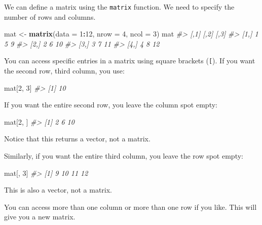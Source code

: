 \documentclass[
]{krantz}
\newenvironment{Shaded}{\begin{snugshade}}{\end{snugshade}}
\newcommand{\CommentTok}[1]{\textcolor[rgb]{0.37,0.37,0.37}{\textit{#1}}}
\newcommand{\DataTypeTok}[1]{\textcolor[rgb]{0.27,0.27,0.27}{#1}}
\newcommand{\DecValTok}[1]{\textcolor[rgb]{0.06,0.06,0.06}{#1}}
\newcommand{\KeywordTok}[1]{\textcolor[rgb]{0.27,0.27,0.27}{\textbf{#1}}}
\newcommand{\NormalTok}[1]{#1}
\newcommand{\OperatorTok}[1]{\textcolor[rgb]{0.43,0.43,0.43}{\textbf{#1}}}
\newcommand{\StringTok}[1]{\textcolor[rgb]{0.5,0.5,0.5}{#1}}
\begin{document}
We can define a matrix using the \texttt{matrix} function. We need to specify the number of rows and columns.

\begin{Shaded}
\begin{Highlighting}[]
\NormalTok{mat <-}\StringTok{ }\KeywordTok{matrix}\NormalTok{(}\DataTypeTok{data =} \DecValTok{1}\OperatorTok{:}\DecValTok{12}\NormalTok{, }\DataTypeTok{nrow =} \DecValTok{4}\NormalTok{, }\DataTypeTok{ncol =} \DecValTok{3}\NormalTok{)}
\NormalTok{mat}
\CommentTok{#>      [,1] [,2] [,3]}
\CommentTok{#> [1,]    1    5    9}
\CommentTok{#> [2,]    2    6   10}
\CommentTok{#> [3,]    3    7   11}
\CommentTok{#> [4,]    4    8   12}
\end{Highlighting}
\end{Shaded}

You can access specific entries in a matrix using square brackets (\texttt{{[}}). If you want the second row, third column, you use:

\begin{Shaded}
\begin{Highlighting}[]
\NormalTok{mat[}\DecValTok{2}\NormalTok{, }\DecValTok{3}\NormalTok{]}
\CommentTok{#> [1] 10}
\end{Highlighting}
\end{Shaded}

If you want the entire second row, you leave the column spot empty:

\begin{Shaded}
\begin{Highlighting}[]
\NormalTok{mat[}\DecValTok{2}\NormalTok{, ]}
\CommentTok{#> [1]  2  6 10}
\end{Highlighting}
\end{Shaded}

Notice that this returns a vector, not a matrix.

Similarly, if you want the entire third column, you leave the row spot empty:

\begin{Shaded}
\begin{Highlighting}[]
\NormalTok{mat[, }\DecValTok{3}\NormalTok{]}
\CommentTok{#> [1]  9 10 11 12}
\end{Highlighting}
\end{Shaded}

This is also a vector, not a matrix.

You can access more than one column or more than one row if you like. This will give you a new matrix.
\end{document}
